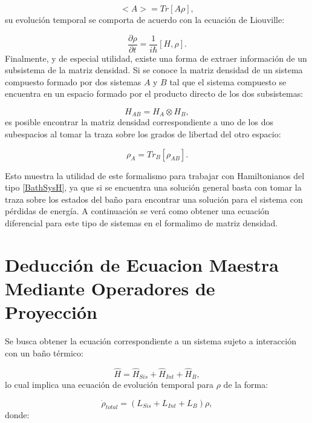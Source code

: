 \documentclass[a4paper,10pt]{report}
\begin{document}
\begin{equation}
<A> = Tr[A\rho],
\end{equation} su evolución temporal se comporta de acuerdo con la ecuación de Liouville:

\begin{equation}
\dfrac{\partial \rho}{\partial t} = \frac{1}{i\hbar}[H,\rho].
\end{equation} Finalmente, y de especial utilidad, existe una forma de extraer información de un subsistema de la matriz densidad. Si se conoce la matriz densidad de un sistema compuesto formado por dos sistemas $A$ y $B$ tal que el sistema compuesto se encuentra en un espacio formado por el producto directo de los dos subsistemas:

\begin{equation}
H_{AB} = H_A \otimes H_B,
\end{equation} es posible encontrar la matriz densidad correspondiente a uno de los dos subespacios al tomar la traza sobre los grados de libertad del otro espacio:

\begin{equation}
\rho_A = Tr_B [\rho_{AB}].
\end{equation}

Esto muestra la utilidad de este formalismo para trabajar con Hamiltonianos del tipo \ref{BathSysH}, ya que si se encuentra una solución general basta con tomar la traza sobre los estados del baño para encontrar una solución para el sistema con pérdidas de energía. A continuación se verá como obtener una ecuación diferencial para este tipo de sistemas en el formalimo de matriz densidad.

\section{Deducción de Ecuacion Maestra Mediante Operadores de Proyección}

Se busca obtener la ecuación correspondiente a un sistema sujeto a interacción con un baño térmico:

\begin{equation}
\hat{H} = \hat{H}_{Sis}+\hat{H}_{Int}+\hat{H}_B,
\end{equation} lo cual implica una ecuación de evolución temporal para $\rho$ de la forma:

\begin{equation}\label{LMeq}
\dot{\rho}_{total} = (L_{Sis}+L_{Int}+L_B)\rho,
\end{equation}donde:
\end{document}
